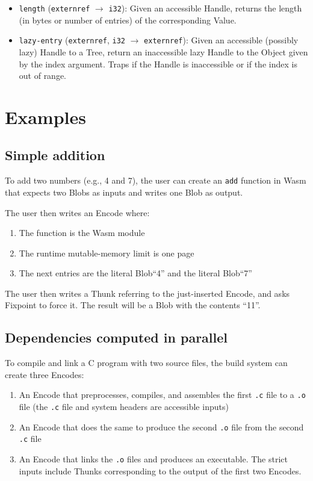 \documentclass{article}
\newcommand{\blob}{\textrm{Blob}\xspace}
\newcommand{\blobs}{\textrm{Blob}s\xspace}
\newcommand{\valuex}{\textrm{Value}\xspace}
\newcommand{\object}{\textrm{Object}\xspace}
\newcommand{\encode}{\textrm{Encode}\xspace}
\newcommand{\thunk}{\textrm{Thunk}\xspace}
\newcommand{\thunks}{\textrm{Thunk}s\xspace}
\newcommand{\encodes}{\textrm{Encode}s\xspace}
\newcommand{\tree}{\textrm{Tree}\xspace}
\newcommand{\handle}{\textrm{Handle}\xspace}
\newcommand{\bs}{\vspace{\baselineskip}}
\begin{document}
\begin{itemize}
\item \texttt{length} (\texttt{externref} $\rightarrow$ \texttt{i32}): Given an accessible \handle, returns the length (in bytes or number of entries) of the corresponding \valuex.

\item \texttt{lazy-entry} (\texttt{externref}, \texttt{i32}
  $\rightarrow$ \texttt{externref}): Given an accessible (possibly
  lazy) \handle to a \tree, return an inaccessible lazy \handle to the
  \object given by the index argument. Traps if the \handle is
  inaccessible or if the index is out of range.
\end{itemize}

\section{Examples}

\subsection{Simple addition} To add two numbers (e.g., 4 and
7), the user can create an \texttt{add} function in Wasm that expects
two \blobs as inputs and writes one \blob as output.

\bs

The user then writes an \encode where:
\begin{enumerate}[itemsep=0pt]
\item The function is the Wasm module
\item The runtime mutable-memory limit is one page
\item The next entries are the literal \blob ``4'' and the literal \blob ``7''
\end{enumerate}

The user then writes a \thunk referring to the just-inserted \encode,
and asks Fixpoint to force it. The result will be a \blob with the
contents ``11''.

\subsection{Dependencies computed in parallel} To compile and link a C program with two source files,
the build system can create three \encodes:
\begin{enumerate}[itemsep=0pt]
\item An \encode that preprocesses, compiles, and assembles the first \texttt{.c} file to a \texttt{.o} file
  (the \texttt{.c} file and system headers are accessible inputs)
\item An \encode that does the same to produce the second \texttt{.o} file from the second \texttt{.c} file
\item An \encode that links the \texttt{.o} files and produces an executable. The strict inputs include \thunks corresponding to the output of the first two \encodes.
\end{enumerate}
\end{document}
